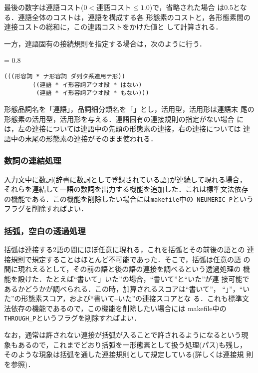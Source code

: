 \documentclass[a4j,titlepage]{jarticle}
\begin{document}
最後の数字は連語コスト($0 < 連語コスト \leq 1.0$)で，省略された場合
は0.5となる．連語全体のコストは，連語を構成する各
形態素のコストと，各形態素間の連接コストの総和に，この連語コストをかけた値と
して計算される．

一方，連語固有の接続規則を指定する場合は，次のように行う．
{\baselineskip = 0.8 \baselineskip
\begin{verbatim}
(((形容詞 * ナ形容詞 ダ列タ系連用テ形))
        ((連語 * イ形容詞アウオ段 * はない)
         (連語 * イ形容詞アウオ段 * もない)))
\end{verbatim}}
形態品詞名を「連語」，品詞細分類名を「{\tt *}」とし，活用型，活用形は連語末
尾の形態素の活用型，活用形を与える．連語固有の連接規則の指定がない場合
には，左の連接については連語中の先頭の形態素の連接，右の連接については
連語中の末尾の形態素の連接がそのまま使われる．

\subsubsection{数詞の連結処理}

入力文中に数詞(辞書に数詞として登録されている語)が連続して現れる場合，
それらを連結して一語の数詞を出力する機能を追加した．これは標準文法依存
の機能である．この機能を削除したい場合には{\tt makefile}中の{\tt
NEUMERIC\_P}というフラグを削除すればよい．
 
\subsubsection{括弧，空白の透過処理}

括弧は連接する2語の間にほぼ任意に現れる，これを括弧とその前後の語との
連接規則で規定することはほとんど不可能であった．そこで，括弧は任意の語
の間に現れえるとして，その前の語と後の語の連接を調べるという透過処理の
機能を設けた．たとえば``書いて」いた''の場合，``書いて''と``いた''が連
接可能であるかどうかが調べられる．この時，加算されるスコアは``書いて''，
``」''，``いた''の形態素スコア，および``書いて--いた''の連接スコアとな
る．これも標準文法依存の機能であるので，この機能を削除したい場合には
makefile中の{\tt THROUGH\_P}というフラグを削除すればよい．

なお，通常は許されない連接が括弧が入ることで許されるようになるという現
象もあるので，これまでどおり括弧を一形態素として扱う処理(パス)も残し，
そのような現象は括弧を通した連接規則として規定している(詳しくは連接規
則を参照)．
\end{document}
